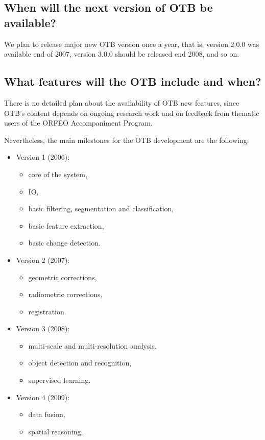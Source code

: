 \subsection{When will the next version of OTB be available?}
We plan to release major new OTB version once a year, that is, version
2.0.0 was available end of 2007, version 3.0.0 should be released
end 2008, and so on.

\subsection{What features will the OTB include and when?}
There is no detailed plan about the availability of OTB new features,
since OTB's content depends on ongoing research work and on feedback
from thematic users of the ORFEO Accompaniment Program.

Nevertheless, the main milestones for the OTB development are the
following:
\begin{itemize}
  \item{Version 1 (2006):}
    \begin{itemize}
    \item core of the system,
    \item IO,
    \item basic filtering, segmentation and classification,
    \item basic feature extraction,
    \item basic change detection.
    \end{itemize}
    \item{Version 2 (2007):}
      \begin{itemize}
      \item geometric corrections,
      \item radiometric corrections,
      \item registration.
      \end{itemize}
    \item{Version 3 (2008):}
      \begin{itemize}
      \item multi-scale and multi-resolution analysis,
      \item object detection and recognition,
      \item supervised learning.
      \end{itemize}
    \item{Version 4 (2009):}
      \begin{itemize}
	\item data fusion,
	\item spatial reasoning.
      \end{itemize}
    
\end{itemize}

